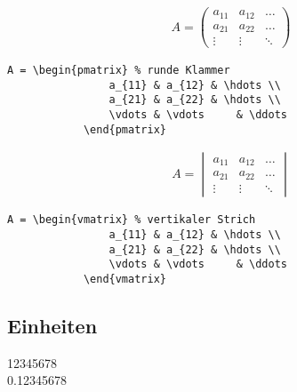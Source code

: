 \begin{align}
A = \begin{pmatrix} %
			a_{11} & a_{12} & \hdots \\
			a_{21} & a_{22} & \hdots \\
			\vdots & \vdots 	& \ddots
		\end{pmatrix}
\end{align}


\lstset{language=[LaTeX]TeX } %
\begin{lstlisting}[gobble=2, frame=none, numbers=none, backgroundcolor=\color{white},%
	caption={},label={code:}]
	A = \begin{pmatrix} % runde Klammer
				a_{11} & a_{12} & \hdots \\
				a_{21} & a_{22} & \hdots \\
				\vdots & \vdots 	& \ddots
			\end{pmatrix}
\end{lstlisting}


\begin{align}
A = \begin{vmatrix} %
			a_{11} & a_{12} & \hdots \\
			a_{21} & a_{22} & \hdots \\
			\vdots & \vdots 	& \ddots
		\end{vmatrix}
\end{align}

\lstset{language=[LaTeX]TeX } %
\begin{lstlisting}[gobble=2, frame=none, numbers=none, backgroundcolor=\color{white},%
	caption={},label={code:}]
	A = \begin{vmatrix} % vertikaler Strich
				a_{11} & a_{12} & \hdots \\
				a_{21} & a_{22} & \hdots \\
				\vdots & \vdots 	& \ddots
			\end{vmatrix}
\end{lstlisting}


\subsection{Einheiten}\label{einheiten }

\num{12345678}\\
\num{.12345678}\\

